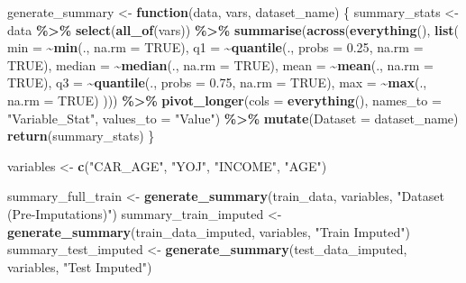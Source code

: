 \documentclass[
]{article}
\newenvironment{Shaded}{\begin{snugshade}}{\end{snugshade}}
\newcommand{\AttributeTok}[1]{\textcolor[rgb]{0.13,0.29,0.53}{#1}}
\newcommand{\ConstantTok}[1]{\textcolor[rgb]{0.56,0.35,0.01}{#1}}
\newcommand{\ControlFlowTok}[1]{\textcolor[rgb]{0.13,0.29,0.53}{\textbf{#1}}}
\newcommand{\FloatTok}[1]{\textcolor[rgb]{0.00,0.00,0.81}{#1}}
\newcommand{\FunctionTok}[1]{\textcolor[rgb]{0.13,0.29,0.53}{\textbf{#1}}}
\newcommand{\NormalTok}[1]{#1}
\newcommand{\OtherTok}[1]{\textcolor[rgb]{0.56,0.35,0.01}{#1}}
\newcommand{\SpecialCharTok}[1]{\textcolor[rgb]{0.81,0.36,0.00}{\textbf{#1}}}
\newcommand{\StringTok}[1]{\textcolor[rgb]{0.31,0.60,0.02}{#1}}
\begin{document}
\begin{Shaded}
\begin{Highlighting}[]
\NormalTok{generate\_summary }\OtherTok{\textless{}{-}} \ControlFlowTok{function}\NormalTok{(data, vars, dataset\_name) \{}
\NormalTok{    summary\_stats }\OtherTok{\textless{}{-}}\NormalTok{ data }\SpecialCharTok{\%\textgreater{}\%}
        \FunctionTok{select}\NormalTok{(}\FunctionTok{all\_of}\NormalTok{(vars)) }\SpecialCharTok{\%\textgreater{}\%}
        \FunctionTok{summarise}\NormalTok{(}\FunctionTok{across}\NormalTok{(}\FunctionTok{everything}\NormalTok{(), }\FunctionTok{list}\NormalTok{(}
            \AttributeTok{min =} \SpecialCharTok{\textasciitilde{}}\FunctionTok{min}\NormalTok{(., }\AttributeTok{na.rm =} \ConstantTok{TRUE}\NormalTok{),}
            \AttributeTok{q1 =} \SpecialCharTok{\textasciitilde{}}\FunctionTok{quantile}\NormalTok{(., }\AttributeTok{probs =} \FloatTok{0.25}\NormalTok{, }\AttributeTok{na.rm =} \ConstantTok{TRUE}\NormalTok{),}
            \AttributeTok{median =} \SpecialCharTok{\textasciitilde{}}\FunctionTok{median}\NormalTok{(., }\AttributeTok{na.rm =} \ConstantTok{TRUE}\NormalTok{),}
            \AttributeTok{mean =} \SpecialCharTok{\textasciitilde{}}\FunctionTok{mean}\NormalTok{(., }\AttributeTok{na.rm =} \ConstantTok{TRUE}\NormalTok{),}
            \AttributeTok{q3 =} \SpecialCharTok{\textasciitilde{}}\FunctionTok{quantile}\NormalTok{(., }\AttributeTok{probs =} \FloatTok{0.75}\NormalTok{, }\AttributeTok{na.rm =} \ConstantTok{TRUE}\NormalTok{),}
            \AttributeTok{max =} \SpecialCharTok{\textasciitilde{}}\FunctionTok{max}\NormalTok{(., }\AttributeTok{na.rm =} \ConstantTok{TRUE}\NormalTok{)}
\NormalTok{        ))) }\SpecialCharTok{\%\textgreater{}\%}
        \FunctionTok{pivot\_longer}\NormalTok{(}\AttributeTok{cols =} \FunctionTok{everything}\NormalTok{(), }\AttributeTok{names\_to =} \StringTok{"Variable\_Stat"}\NormalTok{, }\AttributeTok{values\_to =} \StringTok{"Value"}\NormalTok{) }\SpecialCharTok{\%\textgreater{}\%}
        \FunctionTok{mutate}\NormalTok{(}\AttributeTok{Dataset =}\NormalTok{ dataset\_name)}
    \FunctionTok{return}\NormalTok{(summary\_stats)}
\NormalTok{\}}

\NormalTok{variables }\OtherTok{\textless{}{-}} \FunctionTok{c}\NormalTok{(}\StringTok{"CAR\_AGE"}\NormalTok{, }\StringTok{"YOJ"}\NormalTok{, }\StringTok{"INCOME"}\NormalTok{, }\StringTok{"AGE"}\NormalTok{)}

\NormalTok{summary\_full\_train }\OtherTok{\textless{}{-}} \FunctionTok{generate\_summary}\NormalTok{(train\_data, variables, }\StringTok{"Dataset (Pre{-}Imputations)"}\NormalTok{)}
\NormalTok{summary\_train\_imputed }\OtherTok{\textless{}{-}} \FunctionTok{generate\_summary}\NormalTok{(train\_data\_imputed, variables, }\StringTok{"Train Imputed"}\NormalTok{)}
\NormalTok{summary\_test\_imputed }\OtherTok{\textless{}{-}} \FunctionTok{generate\_summary}\NormalTok{(test\_data\_imputed, variables, }\StringTok{"Test Imputed"}\NormalTok{)}


\end{Highlighting}
\end{Shaded}
\end{document}
